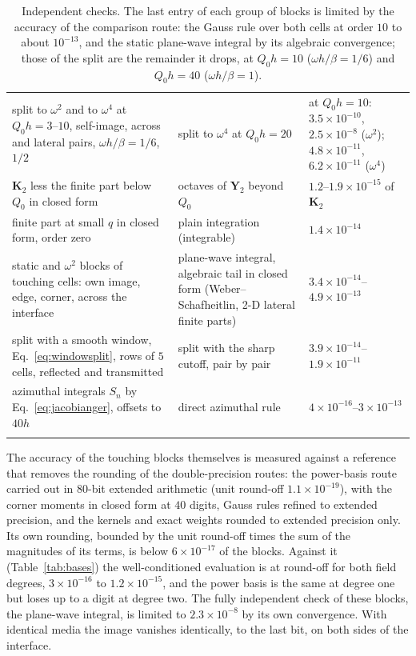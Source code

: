 \documentclass[11pt,a4paper]{article}
\newcommand{\bK}{\mathbf{K}}
\begin{document}
\begin{longtable}{>{\raggedright\arraybackslash}p{}>{\raggedright\arraybackslash}p{}>{\raggedright\arraybackslash}p{}}
split to $\omega^2$ and to $\omega^4$ at $Q_0h=3$--$10$, self-image, across and lateral pairs, $\omega h/\beta=1/6$, $1/2$ & split to $\omega^4$ at $Q_0h=20$ & at $Q_0h=10$: $3.5\times10^{-10}$, $2.5\times10^{-8}$ ($\omega^2$); $4.8\times10^{-11}$, $6.2\times10^{-11}$ ($\omega^4$) \\
$\bK_2$ less the finite part below $Q_0$ in closed form & octaves of $\mathbf Y_2$ beyond $Q_0$ & $1.2$--$1.9\times10^{-15}$ of $\bK_2$ \\
finite part at small $q$ in closed form, order zero & plain integration (integrable) & $1.4\times10^{-14}$ \\
static and $\omega^2$ blocks of touching cells: own image, edge, corner, across the interface & plane-wave integral, algebraic tail in closed form (Weber--Schafheitlin, 2-D lateral finite parts) & $3.4\times10^{-14}$--$4.9\times10^{-13}$ \\
split with a smooth window, Eq.~\eqref{eq:windowsplit}, rows of $5$ cells, reflected and transmitted & split with the sharp cutoff, pair by pair & $3.9\times10^{-14}$--$1.9\times10^{-11}$ \\
azimuthal integrals $S_n$ by Eq.~\eqref{eq:jacobianger}, offsets to $40h$ & direct azimuthal rule & $4\times10^{-16}$--$3\times10^{-13}$ \\
\bottomrule
\caption{Independent checks. The last entry of each group of blocks is limited by the accuracy of the
comparison route: the Gauss rule over both cells at order $10$ to about $10^{-13}$, and the static plane-wave
integral by its algebraic convergence; those of the split are the remainder it drops, at $Q_0h=10$
($\omega h/\beta=1/6$) and $Q_0h=40$ ($\omega h/\beta=1$).}
\label{tab:verification}
\end{longtable}
\endgroup

The accuracy of the touching blocks themselves is measured against a reference that removes the rounding
of the double-precision routes: the power-basis route carried out in $80$-bit extended arithmetic (unit
round-off $1.1\times10^{-19}$), with the corner moments in closed form at $40$ digits, Gauss rules refined to
extended precision, and the kernels and exact weights rounded to extended precision only. Its own rounding,
bounded by the unit round-off times the sum of the magnitudes of its terms, is below $6\times10^{-17}$ of the
blocks. Against it (Table~\ref{tab:bases}) the well-conditioned evaluation is at round-off for both field
degrees, $3\times10^{-16}$ to $1.2\times10^{-15}$, and the power basis is the same at degree one but loses up to
a digit at degree two. The fully independent check of these blocks, the plane-wave integral, is limited to
$2.3\times10^{-8}$ by its own convergence. With identical media the image vanishes identically, to the last
bit, on both sides of the interface.
\end{document}
